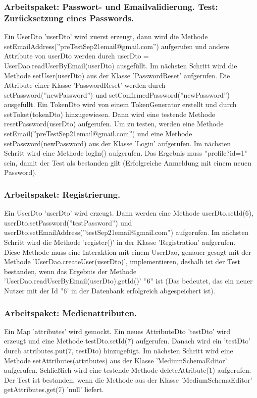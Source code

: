\documentclass{article}
\begin{document}
\subsubsection{Arbeitspaket: Passwort- und Emailvalidierung. Test: Zurücksetzung eines Passwords.}
Ein UserDto 'userDto' wird zuerst erzeugt, dann wird die Methode \linebreak setEmailAddress(''preTestSep21email@gmail.com'') aufgerufen und andere Attribute von userDto werden durch userDto = UserDao.readUserByEmail(userDto) ausgefüllt. Im nächsten Schritt wird die Methode setUser(userDto) aus der Klasse 'PasswordReset' aufgerufen.
Die Attribute einer Klasse 'PasswordReset' werden durch setPassword(''newPassword'') und \linebreak setConfirmedPassword(''newPassword'') ausgefüllt. Ein TokenDto wird von einem TokenGenerator erstellt und durch setToket(tokenDto) hinzugewiesen. Dann wird eine testende Methode resetPassword(userDto) aufgerufen. Um zu testen, werden eine Methode \linebreak setEmail(''preTestSep21email@gmail.com'') und eine Methode setPassword(newPassword) aus der Klasse 'Login' aufgerufen. Im nächsten Schritt wird eine Methode logIn() aufgerufen. Das Ergebnis muss ''profile?id=1'' sein, damit der Test als bestanden gilt (Erfolgreiche Anmeldung mit einem neuen Password).

\subsubsection{Arbeitspaket: Registrierung.}
Ein UserDto 'userDto' wird erzeugt. Dann werden eine Methode userDto.setId(6), \linebreak userDto.setPassword(''testPassword'') und userDto.setEmailAddress(''testSep21email@gmail.com'') \linebreak aufgerufen. Im nächsten Schritt wird die Methode 'register()' in der Klasse 'Registration' aufgerufen. Diese Methode muss eine Interaktion mit einem UserDao, genauer gesagt mit der Methode 'UserDao.createUser(userDto)', implementieren, deshalb ist der Test bestanden, wenn das Ergebnis der Methode 'UserDao.readUserByEmail(userDto).getId()'  ''6'' ist (Das bedeutet, das ein neuer Nutzer mit der Id ''6' in der Datenbank erfolgreich abgespeichert ist).

\subsubsection{Arbeitspaket: Medienattributen.}
Ein Map 'attributes' wird gemockt. Ein neues AttributeDto 'testDto' wird erzeugt und eine Methode testDto.setId(7) aufgerufen. Danach wird ein 'testDto' durch attributes.put(7, testDto) hinzugefügt. Im nächsten Schritt wird eine Methode setAttributes(attributes) aus der Klasse 'MediumSchemaEditor' aufgerufen. Schließlich wird eine testende Methode deleteAttribute(1) aufgerufen. Der Test ist bestanden, wenn die Methode aus der Klasse 'MediumSchemaEditor' getAttributes.get(7) 'null' liefert.
\end{document}
